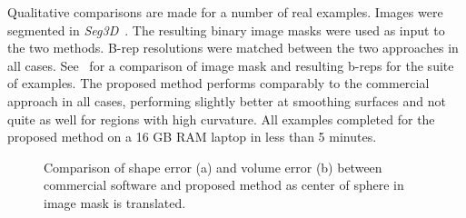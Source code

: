 %
Qualitative comparisons are made for a number of real examples. Images were segmented in \textit{Seg3D}~\cite{Seg3D}. The resulting binary image masks were used as input to the two methods. B-rep resolutions were matched between the two approaches in all cases. See~ for a comparison of image mask and resulting b-reps for the suite of examples. The proposed method performs comparably to the commercial approach in all cases, performing slightly better at smoothing surfaces and not quite as well for regions with high curvature. All examples completed for the proposed method on a 16 GB RAM laptop in less than 5 minutes.
\begin{figure}[ht!]
	\centering
	\caption{Comparison of shape error (a) and volume error (b) between commercial software and proposed method as center of sphere in image mask is translated.}
    \label{fig:graph3}
\end{figure}
